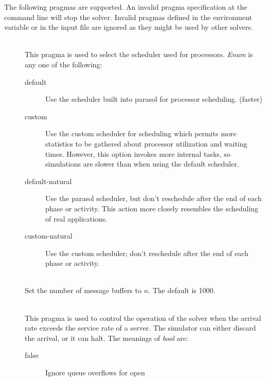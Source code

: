 The following pragmas are supported.  An invalid pragma
specification at the command line
will stop the solver.  Invalid pragmas defined in the environment
variable or in the input file are
ignored as they might be used by other solvers.
\begin{description}
\item[]~\\
  This pragma is used to select the scheduler used for
  processors.  \emph{Enum} is any one of
  the following:
  \begin{description}
  \item[default] Use the scheduler built into parasol for processor
    scheduling.  (faster)
  \item[custom] Use the custom
    scheduler for scheduling which
    permits more statistics to be gathered about processor
    utilization
    and waiting
    times.  However,
    this option invokes more internal tasks, so simulations are slower
    than when using the default scheduler.
  \item[default-natural] Use the parasol scheduler, but don't
    reschedule after the end of
    each phase or
    activity.
    This action more closely resembles the scheduling of real
    applications.
  \item[custom-natural] Use the custom scheduler; don't reschedule
    after the end of each phase or activity.
  \end{description}
\item[]~\\
  Set the number of message buffers to $n$.
  The default is 1000.
\item[] ~\\
  This pragma is used to control the operation of the solver when the
  arrival rate exceeds the service rate of a
  server.  The simulator can either discard the arrival, or it can
  halt.  The meanings of \emph{bool} are:
  \begin{description}
  \item[false] Ignore queue overflows for open

\end{description}
\end{description}
